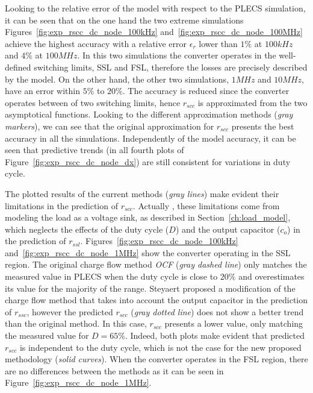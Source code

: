 Looking to the relative error  of the model with respect to the PLECS simulation, it can be seen that on the one hand the two extreme simulations Figures~\ref{fig:exp_rscc_dc_node_100kHz} and~\ref{fig:exp_rscc_dc_node_100MHz} achieve the highest accuracy with a relative error $\epsilon_r$ lower than $1\%$ at $100kHz$ and $4\%$ at $100MHz$. In this two simulations the converter operates in the well-defined switching limits, SSL and FSL, therefore the losses are precisely described by the model.  On the other hand, the other two simulations, $1MHz$ and $10MHz$,  have an error within $5\%$ to $20\%$. The accuracy is reduced since the converter operates between of two switching limits, hence $r_{scc}$ is approximated from the two asymptotical functions. Looking to the different approximation methods (\emph{gray markers}), we can see that the original approximation for $r_{scc}$ presents the best accuracy in all the simulations. Independently of the model accuracy, it can be seen that predictive trends (in all fourth plots of Figure~\ref{fig:exp_rscc_dc_node_dx}) are still consistent for variations in duty cycle.

The plotted results of the current methods (\emph{gray lines}) make evident their  limitations in the prediction of $r_{scc}$. Actually , these limitations come from modeling the load as a voltage sink, as described in Section~\ref{ch:load_model}, which neglects the effects of the duty cycle ($D$) and the output capacitor ($c_o$) in the prediction of $r_{ssl}$. Figures~\ref{fig:exp_rscc_dc_node_100kHz} and~\ref{fig:exp_rscc_dc_node_1MHz} show the converter operating in the SSL region. The original charge flow  method \emph{OCF} (\emph{gray dashed line}) only matches the measured value in PLECS when the duty cycle is close to $20\%$ and overestimates its value for the majority of the range. Steyaert proposed a modification of the charge flow method that takes into account the output capacitor in the prediction of $r_{ssc}$, however the predicted $r_{scc}$ (\emph{gray dotted line}) does not show a better trend than the original method. In this case, $r_{scc}$ presents a lower value, only matching the measured value for $D=65\%$. Indeed, both plots make evident that predicted $r_{scc}$ is independent to the duty cycle, which is not the case for the new proposed methodology (\emph{solid curves}).  When the converter operates in the FSL region, there are no differences between the methods as it can be seen in Figure~\ref{fig:exp_rscc_dc_node_1MHz}.

\begin{figure}[!h]
\newcommand\pHeigh{3.25cm}
\newcommand\pWidth{4cm}
\centering
    \begin{subfigure}{\textwidth}
       \parbox[b]{.45\linewidth}{
            \raggedright
            
        }
       \parbox[b]{.45\linewidth}{
            \raggedleft
            
        }
    \end{subfigure}
\end{figure}



